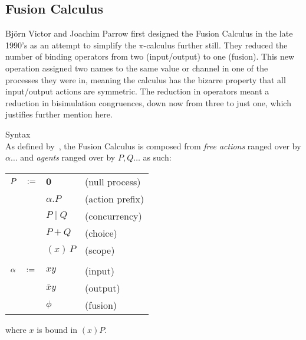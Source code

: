\subsection{Fusion Calculus}

    Bj{\"o}rn Victor and Joachim Parrow first designed the Fusion Calculus in the late 1990's as an attempt to simplify the $\pi$-calculus further still.
    They reduced the number of binding operators from two (input/output) to one (fusion).
    This new operation assigned two names to the same value or channel in one of the processes they were in, meaning the calculus has the bizarre property that all input/output actions are symmetric.
    The reduction in operators meant a reduction in bisimulation congruences, down now from three to just one, which justifies further mention here.
    
    \begin{definition}{Syntax\\}
        As defined by~\cite{fusion-calculus}, the Fusion Calculus is composed from \textit{free actions} ranged over by $\alpha \ldots$ and \textit{agents} ranged over by $P, Q \ldots$ as such:
        \begin{center}
            \begin{tabular}{ l l l }
                $P \quad :=$    & $\textbf{0}$      & (null process) \\
                                    & $\alpha . P$      & (action prefix) \\
                                    & $P \; | \; Q$     & (concurrency) \\
                                    & $P + Q$           & (choice) \\
                                    & $(x) \, P$        & (scope) \\ \\

                $\alpha \quad :=$   & $x y$         & (input) \\
                                        & $\bar{x} y$   & (output) \\
                                        & $\phi$        & (fusion) \\
            \end{tabular}
        \end{center}
        where $x$ is bound in $(x)P$.
    \end{definition}


